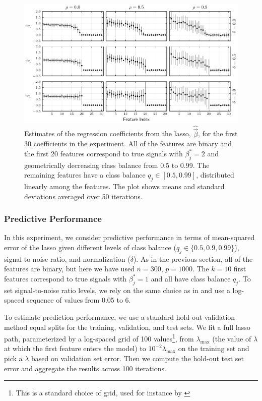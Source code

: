 \begin{figure}[htpb]
  \centering
  \includegraphics[]{plots/binary_decreasing.pdf}
  \caption{%
    Estimates of the regression coefficients from the lasso, \(\hat{\vec{\beta}}\), for the
    first 30 coefficients in the experiment. All of the features are binary and the first 20
    features correspond to true signals with \(\beta_j^* = 2\) and geometrically decreasing
    class balance from 0.5 to 0.99. The remaining features have a class balance \(q_j \in [0.5,
      0.99]\), distributed linearly among the features. The plot shows means and standard
    deviations averaged over 50 iterations.} \label{fig:binary-decreasing}
\end{figure}

\subsubsection{Predictive Performance}\label{sec:predictive-performance}

In this experiment, we consider predictive performance in terms of mean-squared error of
the lasso given different levels of class balance (\(q_j \in \{0.5, 0.9, 0.99\}\)),
signal-to-noise ratio, and normalization (\(\delta\)). As in the previous section, all of
the features are binary, but here we have used \(n=300\), \(p = \num{1000}\). The \(k=10\)
first features correspond to true signals with \(\beta^*_j = 1\) and all have class balance
\(q_j\). To set signal-to-noise ratio levels, we rely on the same choice as in
\citet{hastie2020} and use a log-spaced sequence of values from 0.05 to 6.

To estimate prediction performance, we use a standard hold-out validation method equal
splits for the training, validation, and test sets. We fit a full lasso path, parameterized
by a log-spaced grid of 100 values\footnote{This is a standard choice of grid, used for
  instance by \citet{friedman2010}}, from \(\lambda_\text{max}\) (the value of \(\lambda\) at
which the first feature enters the model) to \(10^{-2}\lambda_\text{max}\) on the training
set and pick a \(\lambda\) based on validation set error. Then we compute the hold-out test
set error and aggregate the results across 100 iterations.

